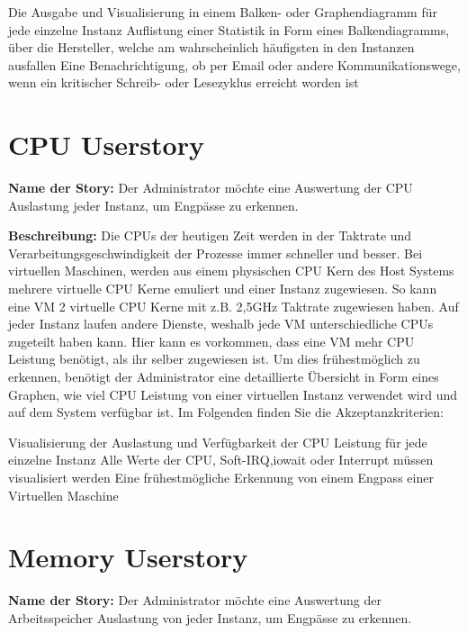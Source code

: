 \begin{outline}
  \1 Die Ausgabe und Visualisierung in einem Balken- oder Graphendiagramm
  für jede einzelne Instanz
  \1 Auflistung einer Statistik in Form eines Balkendiagramms, über die
  Hersteller, welche am wahrscheinlich häufigsten in den Instanzen ausfallen
  \1 Eine Benachrichtigung, ob per Email oder andere Kommunikationswege,
  wenn ein kritischer Schreib- oder Lesezyklus erreicht worden ist
\end{outline}
\mr%

\section{CPU Userstory}
\label{section:CPU_Userstory}
\textbf{Name der Story:} Der Administrator möchte eine Auswertung der CPU
Auslastung jeder Instanz, um Engpässe zu erkennen.

\textbf{Beschreibung:} Die CPUs der heutigen Zeit werden in der Taktrate und
Verarbeitungsgeschwindigkeit der Prozesse immer schneller und besser. Bei
virtuellen Maschinen, werden aus einem physischen CPU Kern des Host Systems
mehrere virtuelle CPU Kerne emuliert und einer Instanz zugewiesen. So kann eine
VM 2 virtuelle CPU Kerne mit z.B. 2,5\si{\giga\hertz} Taktrate zugewiesen
haben. Auf jeder Instanz laufen andere Dienste, weshalb jede VM
unterschiedliche CPUs zugeteilt haben kann. Hier kann es vorkommen, dass eine
VM mehr CPU Leistung benötigt, als ihr selber zugewiesen ist. Um dies
frühestmöglich zu erkennen, benötigt der Administrator eine detaillierte
Übersicht in Form eines Graphen, wie viel CPU Leistung von einer virtuellen
Instanz verwendet wird und auf dem System verfügbar ist. Im Folgenden finden
Sie die Akzeptanzkriterien:

\begin{outline}
  \1 Visualisierung der Auslastung und Verfügbarkeit der CPU Leistung für jede
  einzelne Instanz
  \1 Alle Werte der CPU, \gls{Soft-IRQ},\gls{iowait} oder \gls{Interrupt}
  müssen visualisiert werden
  \1 Eine frühestmögliche Erkennung von einem Engpass einer Virtuellen Maschine
\end{outline}
\mr%

\section{Memory Userstory}
\textbf{Name der Story:} Der Administrator möchte eine Auswertung der
Arbeitsspeicher Auslastung von jeder Instanz, um Engpässe zu erkennen.

